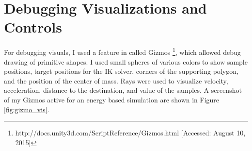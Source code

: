 \section{Debugging Visualizations and Controls}
\label{section:debug_control_vis}

For debugging visuals, I used a feature in \unity{} called Gizmos \footnote{http://docs.unity3d.com/ScriptReference/Gizmos.html [Accessed: August 10, 2015]}, which allowed debug drawing of primitive shapes.  I used small spheres of various colors to show sample positions, target positions for the IK solver, corners of the supporting polygon, and the position of the center of mass.  Rays were used to visualize velocity, acceleration, distance to the destination, and value of the samples.  A screenshot of my Gizmos active for an energy based simulation are shown in Figure \ref{fig:gizmo_vis}.

